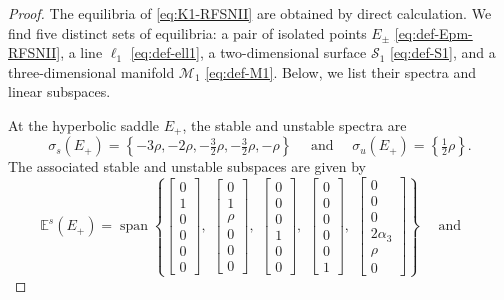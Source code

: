 \documentclass[11pt]{article}
\numberwithin{equation}{section}
\begin{document}
\bigskip
\begin{proof} 
The equilibria of \eqref{eq:K1-RFSNII} are obtained by direct calculation. 
We find five distinct sets of equilibria: 
a pair of isolated points $E_{\pm}$ \eqref{eq:def-Epm-RFSNII}, a line $\ell_1$ \eqref{eq:def-ell1}, a two-dimensional surface $\mathcal S_1$ \eqref{eq:def-S1}, and a three-dimensional manifold $\mathcal M_1$ \eqref{eq:def-M1}. 
Below, we list their spectra and linear subspaces.

At the hyperbolic saddle $E_+$,
the stable and unstable spectra are 
%
\[ \sigma_s(E_+) = \left\{ -3\rho,-2\rho,-\tfrac{3}{2}\rho,-\tfrac{3}{2}\rho,-\rho \right\} \quad  \text{ and } \quad \sigma_u(E_+) = \left\{ \tfrac{1}{2}\rho \right\}. \] 
%
The associated stable and unstable subspaces are given by
%
\[ \mathbb E^s (E_+) = 
\operatorname{span} \left\{  
\begin{bmatrix} 0 \\ 1 \\ 0 \\ 0 \\ 0 \\ 0 \end{bmatrix}, \,\, 
\begin{bmatrix} 0 \\ 1 \\ \rho \\ 0 \\ 0 \\ 0 \end{bmatrix}, \,\,
\begin{bmatrix} 0 \\ 0 \\ 0 \\ 1 \\ 0 \\ 0 \end{bmatrix}, \,\,
\begin{bmatrix} 0 \\ 0 \\ 0 \\ 0 \\ 0 \\ 1 \end{bmatrix}, \,\, 
\begin{bmatrix} 0 \\ 0 \\ 0 \\ 2\alpha_3 \\ \rho \\ 0 \end{bmatrix}
\right\}
\quad \text{ and } \quad 
\]
\end{proof}
\end{document}
